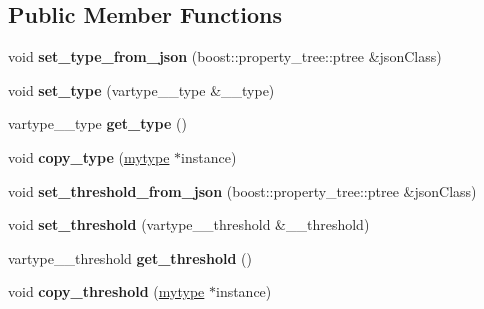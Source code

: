 \subsection*{Public Member Functions}
\begin{DoxyCompactItemize}
\item 
\mbox{\label{classfilter_1_1algos_1_1_binary_a16019a62863f67b2d63d3727fc05e030}} 
void {\bfseries set\+\_\+type\+\_\+from\+\_\+json} (boost\+::property\+\_\+tree\+::ptree \&json\+Class)
\item 
\mbox{\label{classfilter_1_1algos_1_1_binary_a04e237beabe0b8c7805f71686fd5d57c}} 
void {\bfseries set\+\_\+type} (vartype\+\_\+\+\_\+type \&\+\_\+\+\_\+type)
\item 
\mbox{\label{classfilter_1_1algos_1_1_binary_ac298e2242700e8b36670e7aa14aaa521}} 
vartype\+\_\+\+\_\+type {\bfseries get\+\_\+type} ()
\item 
\mbox{\label{classfilter_1_1algos_1_1_binary_afd69f61c643841bb929fc822f8316135}} 
void {\bfseries copy\+\_\+type} (\hyperlink{classfilter_1_1algos_1_1_binary}{mytype} $\ast$instance)
\item 
\mbox{\label{classfilter_1_1algos_1_1_binary_a6e77978b82ce5ceb2c86f01550351e0c}} 
void {\bfseries set\+\_\+threshold\+\_\+from\+\_\+json} (boost\+::property\+\_\+tree\+::ptree \&json\+Class)
\item 
\mbox{\label{classfilter_1_1algos_1_1_binary_af8b5a502f74256e80d03814e9c4e0ca8}} 
void {\bfseries set\+\_\+threshold} (vartype\+\_\+\+\_\+threshold \&\+\_\+\+\_\+threshold)
\item 
\mbox{\label{classfilter_1_1algos_1_1_binary_a971aa9d8f12ac3b8dcbe16d40e914c3c}} 
vartype\+\_\+\+\_\+threshold {\bfseries get\+\_\+threshold} ()
\item 
\mbox{\label{classfilter_1_1algos_1_1_binary_a7cba60d43da0e82e25d1ae07692aee2c}} 
void {\bfseries copy\+\_\+threshold} (\hyperlink{classfilter_1_1algos_1_1_binary}{mytype} $\ast$instance)

\end{DoxyCompactItemize}
